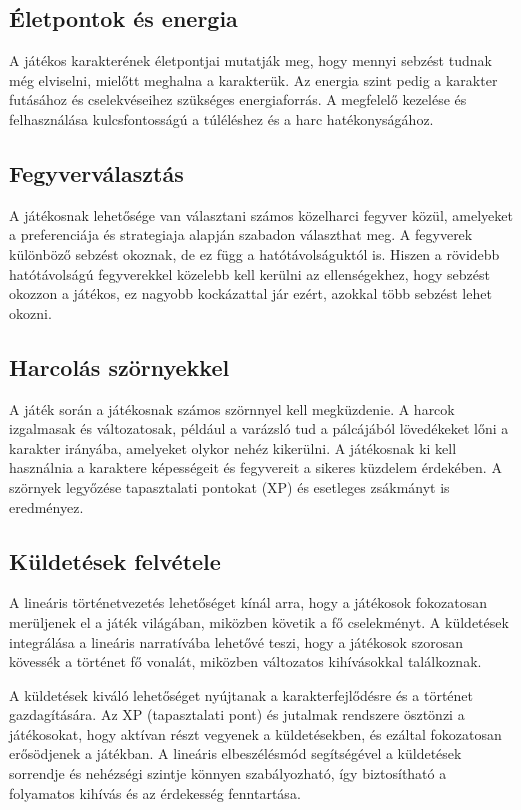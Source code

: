 \subsection{Életpontok és energia}

 A játékos karakterének életpontjai mutatják meg, hogy mennyi sebzést tudnak még elviselni, mielőtt meghalna a karakterük. Az energia szint pedig a karakter futásához és cselekvéseihez szükséges energiaforrás. A megfelelő kezelése és felhasználása kulcsfontosságú a túléléshez és a harc hatékonyságához.

\subsection{Fegyverválasztás}

 A játékosnak lehetősége van választani számos közelharci fegyver közül, amelyeket a preferenciája és strategiaja alapján szabadon választhat meg. A fegyverek különböző sebzést okoznak, de ez függ a hatótávolságuktól is. Hiszen a rövidebb hatótávolságú fegyverekkel közelebb kell kerülni az ellenségekhez, hogy sebzést okozzon a játékos, ez nagyobb kockázattal jár ezért, azokkal több sebzést lehet okozni.

\subsection{Harcolás szörnyekkel}

 A játék során a játékosnak számos szörnnyel kell megküzdenie. A harcok izgalmasak és változatosak, például a varázsló tud a pálcájából lövedékeket lőni a karakter irányába, amelyeket olykor nehéz kikerülni. A játékosnak ki kell használnia a karaktere képességeit és fegyvereit a sikeres küzdelem érdekében. A szörnyek legyőzése tapasztalati pontokat (XP) és esetleges zsákmányt is eredményez.

\subsection{Küldetések felvétele}

 A lineáris történetvezetés lehetőséget kínál arra, hogy a játékosok fokozatosan merüljenek el a játék világában, miközben követik a fő cselekményt. A küldetések integrálása a lineáris narratívába lehetővé teszi, hogy a játékosok szorosan kövessék a történet fő vonalát, miközben változatos kihívásokkal találkoznak.

A küldetések kiváló lehetőséget nyújtanak a karakterfejlődésre és a történet gazdagítására. Az XP (tapasztalati pont) és jutalmak rendszere ösztönzi a játékosokat, hogy aktívan részt vegyenek a küldetésekben, és ezáltal fokozatosan erősödjenek a játékban. A lineáris elbeszélésmód segítségével a küldetések sorrendje és nehézségi szintje könnyen szabályozható, így biztosítható a folyamatos kihívás és az érdekesség fenntartása.

